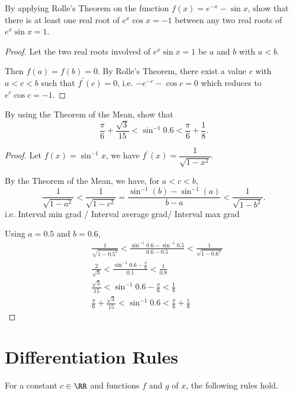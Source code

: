 \begin{exercise}{}{}
By applying Rolle's Theorem on the function $f(x)=e^{-x}-\sin x$, show that there is at least one real root of $e^x\cos x=-1$ between any two real roots of $e^x\sin x=1$.
\end{exercise}

\begin{proof}
Let the two real roots involved of $e^x\sin x=1$ be $a$ and $b$ with $a<b$.

Then $f(a)=f(b)=0$. By Rolle's Theorem, there exist a value $c$ with $a<c<b$ such that $f^\prime(c)=0$, i.e. $-e^{-c}-\cos c=0$ which reduces to $e^c\cos c=-1$.
\end{proof}

\begin{exercise}{}{}
By using the Theorem of the Mean, show that
\[ \frac{\pi}{6}+\frac{\sqrt{3}}{15}<\sin^{-1}0.6<\frac{\pi}{6}+\frac{1}{8}. \]
\end{exercise}

\begin{proof}
Let $f(x)=\sin^{-1}x$, we have $f^\prime(x)=\dfrac{1}{\sqrt{1-x^2}}$.

By the Theorem of the Mean, we have, for $a<c<b$,
\[ \frac{1}{\sqrt{1-a^2}}<\frac{1}{\sqrt{1-c^2}}=\frac{\sin^{-1}(b)-\sin^{-1}(a)}{b-a}<\frac{1}{\sqrt{1-b^2}}. \]
i.e. Interval min grad / Interval average grad/ Interval max grad

Using $a=0.5$ and $b=0.6$,
\begin{align*}
&\frac{1}{\sqrt{1-0.5^2}}<\frac{\sin^{-1}0.6-\sin^{-1}0.5}{0.6-0.5}<\frac{1}{\sqrt{1-0.6^2}} \\
&\frac{2}{\sqrt{3}}<\frac{\sin^{-1}0.6-\frac{\pi}{6}}{0.1}<\frac{1}{0.8} \\
&\frac{\sqrt{3}}{15}<\sin^{-1}0.6-\frac{\pi}{6}<\frac{1}{8} \\
&\frac{\pi}{6}+\frac{\sqrt{3}}{15}<\sin^{-1}0.6<\frac{\pi}{6}+\frac{1}{8}
\end{align*}
\end{proof}
\pagebreak

\section{Differentiation Rules}
For a constant $c\in\RR$ and functions $f$ and $g$ of $x$, the following rules hold.

